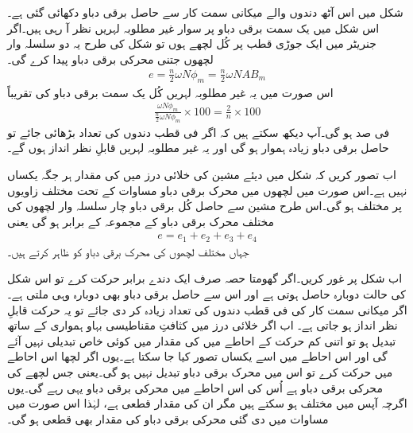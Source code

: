 شکل   میں اس آٹھ دندوں والے میکانی سمت کار سے حاصل برقی دباو دکھائی گئی ہے۔اس شکل میں یک سمت  برقی دباو پر سوار غیر مطلوبہ  لہریں نظر آ رہی ہیں۔اگر جنریٹر میں ایک جوڑی قطب پر کُل  لچھے ہوں تو شکل   کی طرح یہ دو   سلسلہ وار لچھوں جتنی محرکی برقی دباو پیدا کرے گی۔
\begin{align}\label{مساوات_یکسمتی_پیدا_دباو_الف}
e=\frac{n}{2} \omega N \phi_m=\frac{n}{2} \omega N A B_m
\end{align}
اس صورت میں یہ غیر مطلوبہ لہریں کُل یک سمت  برقی دباو کی تقریباً
\begin{align}\label{مساوات_یکسمتی_فی_صد_لہر}
\frac{\omega N \phi_m}{\frac{n}{2} \omega N \phi_m} \times 100=\frac{2}{n} \times 100
\end{align}
فی صد ہو گی۔آپ دیکھ سکتے ہیں کہ اگر فی قطب دندوں کی تعداد بڑھائی جائے تو حاصل برقی دباو زیادہ ہموار ہو گی اور یہ غیر مطلوبہ لہریں قابلِ نظر انداز ہوں گے۔

اب تصور کریں کہ شکل   میں دیئے مشین کی خلائی درز میں  کی مقدار ہر جگہ یکساں نہیں ہے۔اس صورت میں لچھوں میں محرک برقی دباو مساوات   کے تحت مختلف زاویوں پر مختلف ہو گی۔اس طرح مشین سے حاصل کُل برقی دباو چار سلسلہ وار لچھوں کی مختلف محرک برقی دباو کے مجموعہ کے برابر ہو گی یعنی
\begin{align} \label{مساوات_یکسمتی_کل_دباو_مجموعہ}
e=e_1+e_2+e_3+e_4
\end{align}
جہاں   مختلف لچھوں کی محرک برقی دباو کو ظاہر کرتے ہیں۔

اب شکل   پر غور کریں۔اگر گھومتا حصہ صرف ایک دندے برابر حرکت کرے تو اس شکل کی حالت  دوبارہ حاصل ہوتی ہے اور اس سے حاصل برقی دباو بھی دوبارہ وہی ملتی ہے۔اگر میکانی سمت کار کی فی قطب دندوں کی تعداد زیادہ کر دی جائے تو یہ حرکت قابلِ نظر انداز ہو جاتی ہے۔ اب اگر خلائی درز میں کثافتِ مقناطیسی بہاو ہمواری کے ساتھ تبدیل ہو تو اتنی کم حرکت کے احاطے میں  کی مقدار میں کوئی خاص تبدیلی نہیں آئے گی اور اس احاطے میں اسے یکساں تصور کیا جا سکتا ہے۔یوں اگر لچھا اس احاطے میں حرکت کرے تو اس میں محرک برقی دباو تبدیل نہیں ہو گی۔یعنی جس لچھے کی محرکی برقی دباو  ہے اُس کی اس احاطے میں محرکی برقی دباو یہی رہے گی۔یوں اگرچہ  آپس میں مختلف ہو سکتے ہیں مگر ان کی مقدار قطعی ہے، لہٰذا اس صورت میں مساوات   میں دی گئی محرکی برقی دباو کی مقدار بھی قطعی ہو گی۔ 

